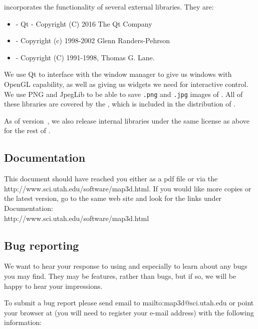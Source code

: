\map{} incorporates the functionality of several external libraries.  They
are:
\begin{itemize}
  \item {} - Qt -
    Copyright (C) 2016 The Qt Company
  \item {} - Copyright (c)
    1998-2002 Glenn Randers-Pehrson 
  \item {} - Copyright (C)
    1991-1998, Thomas G. Lane.
\end{itemize}

We use Qt to interface with the window manager to give us
windows with OpenGL capability, as well as giving us widgets we need for
interactive control.  We use PNG and JpegLib to be able to save
\texttt{.png} and \texttt{.jpg} images of \map{}.
All of these libraries are covered by the , which is included in the
distribution of \map{}.

As of version~\version{}, we also release internal libraries under the
same license as above for the rest of \map{}.  

\subsection{Documentation}

This document should have reached you either as a pdf file or via the
{http://www.sci.utah.edu/software/map3d.html}.  If you would like more
copies or the latest version, go to the
same web site and look for the links under Documentation:\\

{http://www.sci.utah.edu/software/map3d.html}

\subsection{Bug reporting}
\label{sec:bugs}

We want to hear your response to using \map{} and especially to learn about
any bugs you may find.  They may be features, rather than bugs, but if so,
we will be happy to hear your impressions.

To submit a bug report please send email to 
 {mailto:map3d@sci.utah.edu}
or point your browser at
(you will need to register your e-mail
address) with the following information:

